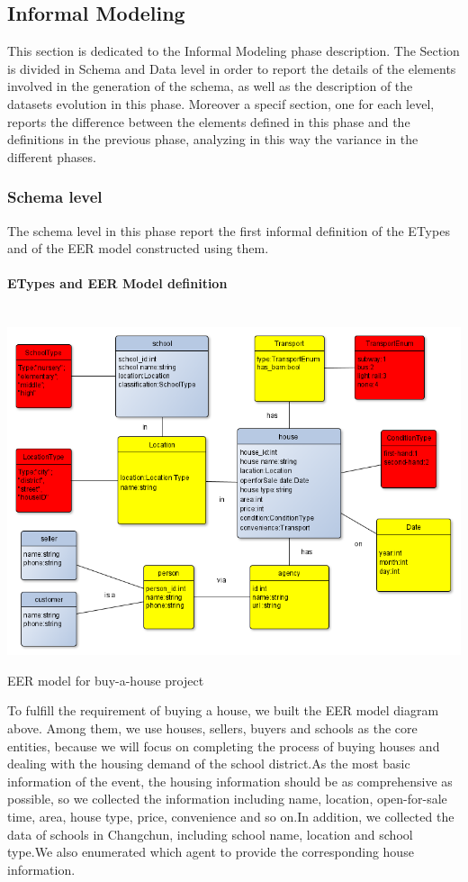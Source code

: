 \subsection{Informal Modeling}
This section is dedicated to the Informal Modeling phase description. The Section is divided in Schema and Data level in order to report the details of the elements involved in the generation of the schema, as well as the description of the datasets evolution in this phase. Moreover a specif section, one for each level, reports the difference between the elements defined in this phase and the definitions in the previous phase, analyzing in this way the variance in the different phases. 

\subsubsection{Schema level}
The schema level in this phase report the first informal definition of the ETypes and of the EER model constructed using them. 

\paragraph{ETypes and EER Model definition}\mbox{}\\
\includegraphics[width=18cm]{student codebook/sections/EER2.png}
    \caption{EER model for buy-a-house project}

To fulfill the requirement of buying a house, we built the EER model diagram above.
Among them, we use houses, sellers, buyers and schools as the core entities, because we will focus on completing the process of buying houses and dealing with the housing demand of the school district.As the most basic information of the event, the housing information should be as comprehensive as possible, so we collected the information including name, location, open-for-sale time, area, house type, price, convenience and so on.In addition, we collected the data of schools in Changchun, including school name, location and school type.We also enumerated which agent to provide the corresponding house information.

